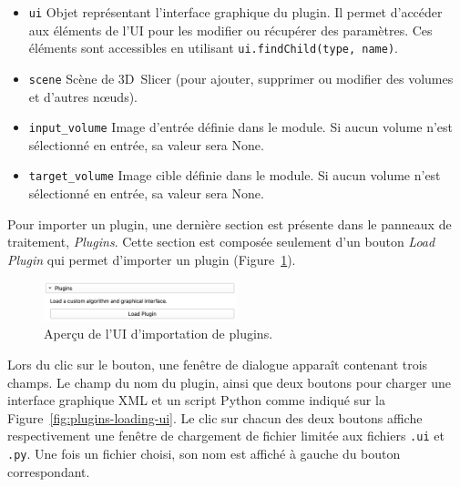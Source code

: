\documentclass{article}
\begin{document}
{{        \begin{itemize}
            \item \texttt{ui} Objet représentant l'interface graphique du plugin. Il permet d'accéder aux éléments de l'UI pour les modifier ou récupérer des paramètres. Ces éléments sont accessibles en utilisant \texttt{ui.findChild(type, name)}.

            \item \texttt{scene} Scène de 3D~Slicer (pour ajouter, supprimer ou modifier des volumes et d'autres nœuds).

            \item \texttt{input\_volume} Image d'entrée définie dans le module. Si aucun volume n'est sélectionné en entrée, sa valeur sera None.

            \item \texttt{target\_volume} Image cible définie dans le module. Si aucun volume n'est sélectionné en entrée, sa valeur sera None.
        \end{itemize}

        \bigskip

        Pour importer un plugin, une dernière section est présente dans le panneaux de traitement, \textit{Plugins}. Cette section est composée seulement d'un bouton \textit{Load Plugin} qui permet d'importer un plugin (Figure~\ref{fig:plugins-ui}).

        \begin{figure}[!ht]
            \centering
            \includegraphics[width=0.5\textwidth]{images/plugins-ui.png}
            \caption{Aperçu de l'UI d'importation de plugins.}
            \label{fig:plugins-ui}
        \end{figure}

        Lors du clic sur le bouton, une fenêtre de dialogue apparaît contenant trois champs. Le champ du nom du plugin, ainsi que deux boutons pour charger une interface graphique XML et un script Python comme indiqué sur la Figure~\ref{fig:plugins-loading-ui}. Le clic sur chacun des deux boutons affiche respectivement une fenêtre de chargement de fichier limitée aux fichiers \texttt{.ui} et \texttt{.py}. Une fois un fichier choisi, son nom est affiché à gauche du bouton correspondant.

}}
\end{document}
